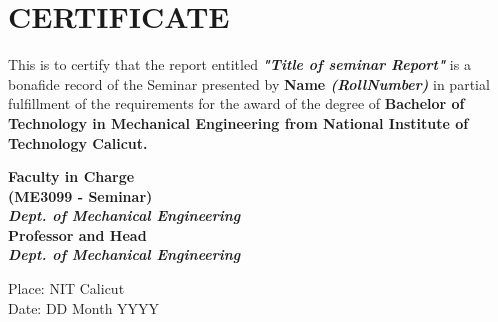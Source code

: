 

\chapter*{\centering \textbf{\MakeUppercase{CERTIFICATE}}}
\justifying
\normalsize This is to certify that the report entitled  \textbf{\textit{ "Title of seminar Report"}} is a bonafide record of the Seminar presented by \textbf{ Name \textit{ (RollNumber)}} in partial fulfillment of the requirements for the award of the degree of \bf{Bachelor of Technology in Mechanical Engineering from National Institute of Technology Calicut}.\\[1.0cm]    

\begin{flushright}
\texttt{}\bf{Faculty in Charge}\texttt{}\\
(ME3099 - Seminar)\\
\emph{Dept. of Mechanical Engineering}\\[1.5cm]

\textbf{Professor and Head}\\
\emph{Dept. of Mechanical Engineering}
\end{flushright}

\begin{flushleft}
Place: NIT Calicut\\
\vspace{1.0}
Date: DD Month YYYY
\end{flushleft}
